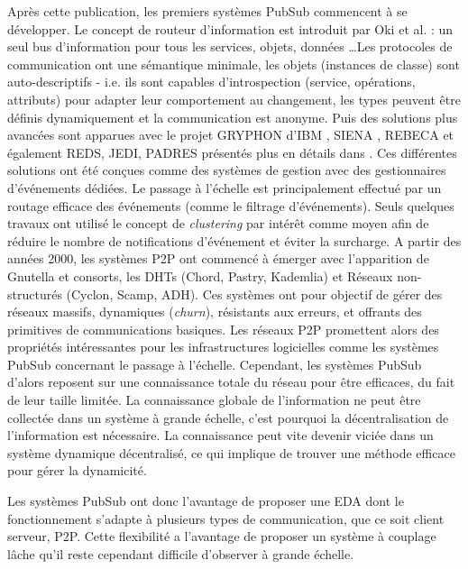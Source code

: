 Après cette publication, les premiers systèmes \gls{PubSub} commencent à 
se développer. Le concept de routeur d'information est introduit par Oki et al. 
\cite{Oki1993} : un seul bus d'information pour tous les services, objets, données
\ldots Les protocoles de communication ont une sémantique minimale, 
les objets (instances de classe) sont auto-descriptifs - i.e. ils sont 
capables d'introspection (service, opérations, attributs) pour adapter leur 
comportement au changement, les types peuvent être définis dynamiquement et 
la communication est anonyme. 
Puis des solutions plus avancées sont apparues avec le projet 
GRYPHON d'IBM \cite{Banavar1999}, SIENA \cite{Carzaniga2000}, REBECA 
\cite{Parzyjegla2010} et également REDS, JEDI, PADRES présentés plus en 
détails dans \cite{Tarkoma2012}.
Ces différentes solutions ont été conçues comme des systèmes de gestion avec 
des gestionnaires d'événements dédiées. Le passage à l'échelle est 
principalement effectué par un routage efficace des événements (comme le 
filtrage d'événements). Seuls quelques travaux ont utilisé le concept de 
\textit{clustering} par intérêt comme moyen afin de réduire le nombre de 
notifications d'événement et éviter la surcharge. 
A partir des années 2000, les 
systèmes \gls{P2P} ont commencé à émerger avec 
l'apparition de Gnutella et consorts, les \glspl{DHT} (Chord, Pastry, Kademlia) et  
Réseaux non-structurés (Cyclon, Scamp, ADH). Ces systèmes ont pour 
objectif de gérer des réseaux massifs, dynamiques (\textit{churn}), résistants 
aux 
erreurs, et offrants des primitives de communications basiques.
Les réseaux \gls{P2P} promettent alors des propriétés intéressantes pour les 
infrastructures logicielles comme les systèmes \gls{PubSub} concernant le passage à 
l'échelle. Cependant, les systèmes \gls{PubSub} d'alors reposent sur une connaissance 
totale du réseau pour être efficaces, du fait de leur taille limitée. La connaissance 
globale de l'information ne peut être collectée dans un système à grande échelle, 
c'est pourquoi la décentralisation de l'information est nécessaire. La connaissance 
peut vite devenir viciée dans un système dynamique décentralisé, ce qui implique 
de trouver une méthode efficace pour gérer la dynamicité.

Les systèmes \gls{PubSub} ont donc l'avantage de proposer une \gls{EDA} dont le 
fonctionnement s'adapte à plusieurs types de communication, que ce soit client 
serveur, P2P. Cette flexibilité a l'avantage de proposer un système à couplage 
lâche qu'il reste cependant difficile d'observer à grande échelle.

